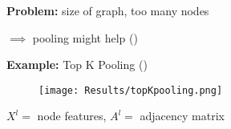 \vspace*{-0.3cm}
\textbf{Problem:} size
 of graph, too many nodes\par
$\implies$ pooling might help (\cite{poolingInGNNs})\par
\textbf{Example:} Top K Pooling (\cite{topKPooling})
\begin{figure}
    \centering
    \texttt{[image: Results/topKpooling.png]}
\end{figure}
\begin{center}
    $X^l=$ node features, $A^l=$ adjacency matrix
\end{center}